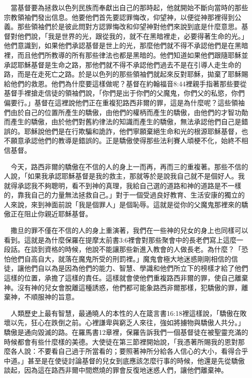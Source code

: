 \documentclass{book}
\begin{document}
　當基督要為拯救以色列民族而奉獻出自己的那時起，他就開始不斷向當時的那些宗教領袖們發出信息。他要他們首先要認罪悔改，仰望神，以便從神那裡得到公義。那些領袖們於是彼此問對方認罪悔改和仰望神對他們來說到底是什麼意思。基督對他們說，「我是世界的光，跟從我的，就不在黑暗裡走，必要得著生命的光。」他們意識到，如果他們承認基督是世上的光，那麼他們就不得不承認他們是在黑暗裡，而且他們所教導的所有那些律法也都是黑暗的。他們知道如果他們跟隨耶穌並承認耶穌基督是生命之路，那他們就不得不承認他們過去不是在引導人走生命的路，而是在走死亡之路。於是以色列的那些領袖們就起來反對耶穌，拋棄了耶穌賜給他們的救恩。他們為什麼要這樣做呢？基督在約翰福音8:44裡親手指著那些要從基督手裡搶走信徒的領袖們說，「你們是出于你們的父魔鬼，你們父的私慾，你們偏要行。」基督在這裡說他們正在重複犯路西非爾的罪，這是為什麼呢？這些領袖們由於自己的位置所產生的驕傲，由他們的權柄而產生的驕傲，由他們的才智功勣而產生的驕傲，由於他們對舊約律法的知識而產生的驕傲，無法承認他們自己是錯誤的。耶穌說他們是在行欺騙和詭詐，他們寧願棄絕生命和光的根源耶穌基督，也不願意承認他們的教導是錯誤的。正是驕傲使得那些法利賽人頑梗不化，始終不相信基督。

　今天，路西非爾的驕傲在不信的人的身上一而再，再而三的重複著。那些不信的人說，「如果我承認耶穌基督是我的救主，那就等於是說我自己就不是個好人。我就得承認我不夠聰明，看不到神的真理，我給自己選的道路和神的道路是不一樣的，靠我自己的力量無法拯救自己。」對于一個受過良好教育、生活安康的獨立的人來說，來到神面前說「我是個罪人」是個恥辱。這就是從你的父魔鬼那裡來的驕傲正在阻止你親近耶穌基督。

　撒旦的罪不僅在不信的人的身上重演著，我們在一些神的兒女的身上也同樣可以看到。這就是為什麼保羅在提摩太前書3:6裡會對那些聚會中的長老們寫上這麼一段話。在談到資格的時候，他說不能讓那些新進入教會的人做長老。為什麼？「恐怕他們自高自大，就落在魔鬼所受的刑罰裡。」魔鬼會極大地迷惑剛剛相信的信徒，讓他們自以為是因為他們的能力、智慧、學識和他們所立下的榜樣才給了他們這樣的位置，承擔了這樣的責任。這樣就會使他們重複路西非爾的罪，使自己離棄神。沒有神的兒女會脫離這種誘惑，他們都可能象路西非爾那樣，犯驕傲的罪，離棄神，不順服神的旨意。

　人類歷史上最有智慧，最通曉人的本性的人在箴言書16:18裡這樣說，「驕傲在敗壞以先，狂心在跌倒之前。心裡謙卑與窮乏人來往，強如將擄物與驕傲人共分。」驕傲是通向毀滅的路。在羅馬書12章裡，保羅告訴我們一個基督徒在被聖靈充滿的時候都會有些什麼樣的美德。大使徒在第三節裡開始說，「我憑著所賜我的恩對那麼各人說：不要看自己過于所當看的；要照著神所分給各人信心的大小，看得合乎中道。」甚至是在使徒討論基督的兒女到底應該怎麼行事的時候，他還是先從驕傲談起，因為這在路西非爾中間燃燒的罪會反復地迷惑人們，讓他們離棄神。
\end{document}
